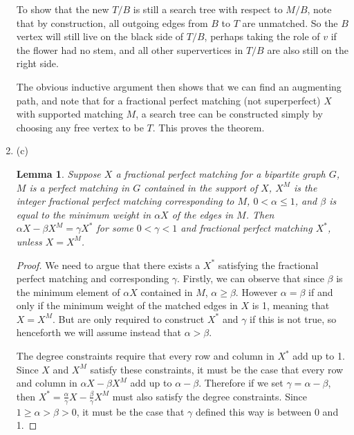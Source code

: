 \documentclass{hmcpset}
\newtheorem{lemma}{Lemma}
\begin{document}
\begin{solution}
\begin{enumerate}
To show that the new $T/B$ is still a search tree with respect to $M/B$, note that by construction, all outgoing edges from $B$ to $T$ are unmatched. So the $B$ vertex will still live on the black side of $T/B$, perhaps taking the role of $v$ if the flower had no stem, and all other supervertices in $T/B$ are also still on the right side.

The obvious inductive argument then shows that we can find an augmenting path, and note that for a fractional perfect matching (not superperfect) $X$ with supported matching $M$, a search tree can be constructed simply by choosing any free vertex to be $T$. This proves the theorem.

\item (c)

\begin{lemma}
  Suppose $X$ a fractional perfect matching for a bipartite graph $G$,
  $M$ is a perfect matching in $G$ contained in the support of $X$,
  $X^M$ is the integer fractional perfect matching corresponding to $M$,
  $0 < \alpha \leq 1$, and $\beta$ is equal to the minimum weight in $\alpha X$
  of the edges in $M$. Then $\alpha X - \beta X^M = \gamma X^*$ for some
  $0 < \gamma < 1$ and fractional perfect matching $X^*$, unless $X = X^M$.
\end{lemma}

\begin{proof}

  We need to argue that there exists a $X^*$ satisfying the fractional
  perfect matching and corresponding $\gamma$.
  Firstly, we can observe that since $\beta$ is the minimum element of
  $\alpha X$ contained in $M$, $\alpha \geq \beta$. However $\alpha = \beta$
  if and only if the minimum weight of the matched edges in $X$ is 1, meaning
  that $X = X^M$. But are only required to construct $X^*$ and $\gamma$ if
  this is not true, so henceforth we will assume instead that $\alpha > \beta$.

  The degree constraints require that every row and column in $X^*$ add up to
  1. Since $X$ and $X^M$ satisfy these constraints, it
  must be the case that every row and column in $\alpha X - \beta X^M$
  add up to $\alpha - \beta$. Therefore if we set $\gamma = \alpha - \beta$,
  then $X^* = \frac{\alpha}{\gamma} X - \frac{\beta}{\gamma} X^M$ must
  also satisfy the degree constraints. Since $1 \geq \alpha > \beta > 0$, it must
  be the case that $\gamma$ defined this way is between 0 and 1.
  

\end{proof}
\end{enumerate}
\end{solution}
\end{document}
